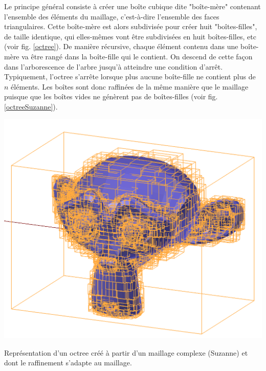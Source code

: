 Le principe général consiste à créer une boîte cubique dite "boîte-mère" contenant l'ensemble des éléments du maillage, c'est-à-dire l'ensemble des faces triangulaires. Cette boîte-mère est alors subdivisée pour créer huit "boîtes-filles", de taille identique, qui elles-mêmes vont être subdivisées en huit boîtes-filles, etc (voir fig. \ref{octree}). De manière récursive, chaque élément contenu dans une boîte-mère va être rangé dans la boîte-fille qui le contient. On descend de cette façon dans l'arborescence de l'arbre jusqu'à atteindre une condition d'arrêt. Typiquement, l'\gls{octree} s'arrête lorsque plus aucune boîte-fille ne contient plus de $n$ éléments. Les boîtes sont donc raffinées de la même manière que le maillage puisque que les boîtes vides ne génèrent pas de boîtes-filles (voir fig. \ref{octreeSuzanne}).

\begin{figureth}
	\includegraphics[width=0.6\linewidth]{images/octreeSuzanne}
	\caption{Représentation d'un \gls{octree} créé à partir d'un maillage complexe (Suzanne) et dont le raffinement s'adapte au maillage.}
	\label{octreeSuzanne}
\end{figureth}

